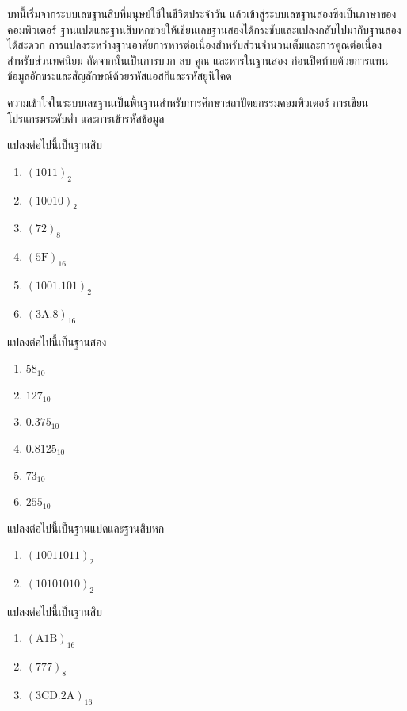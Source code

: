 \label{sec:chapter-summary-numbase}
บทนี้เริ่มจากระบบเลขฐานสิบที่มนุษย์ใช้ในชีวิตประจำวัน แล้วเข้าสู่ระบบเลขฐานสองซึ่งเป็นภาษาของคอมพิวเตอร์ ฐานแปดและฐานสิบหกช่วยให้เขียนเลขฐานสองได้กระชับและแปลงกลับไปมากับฐานสองได้สะดวก การแปลงระหว่างฐานอาศัยการหารต่อเนื่องสำหรับส่วนจำนวนเต็มและการคูณต่อเนื่องสำหรับส่วนทศนิยม ถัดจากนั้นเป็นการบวก ลบ คูณ และหารในฐานสอง ก่อนปิดท้ายด้วยการแทนข้อมูลอักขระและสัญลักษณ์ด้วยรหัสแอสกีและรหัสยูนิโคด

ความเข้าใจในระบบเลขฐานเป็นพื้นฐานสำหรับการศึกษาสถาปัตยกรรมคอมพิวเตอร์ การเขียนโปรแกรมระดับต่ำ และการเข้ารหัสข้อมูล~\parencite{rosen2019discrete}


\clearpage
{}
\label{sec:exercises-numbase}
\begin{exercise}
แปลงต่อไปนี้เป็นฐานสิบ
\begin{enumerate}
    \item $(1011)_2$
    \item $(10010)_2$
    \item $(72)_8$
    \item $(5\mathrm{F})_{16}$
    \item $(1001.101)_2$
    \item $(3\mathrm{A}.8)_{16}$
\end{enumerate}
\end{exercise}

\begin{exercise}
แปลงต่อไปนี้เป็นฐานสอง
\begin{enumerate}
    \item $58_{10}$
    \item $127_{10}$
    \item $0.375_{10}$
    \item $0.8125_{10}$
    \item $73_{10}$
    \item $255_{10}$
\end{enumerate}
\end{exercise}

\begin{exercise}
แปลงต่อไปนี้เป็นฐานแปดและฐานสิบหก
\begin{enumerate}
    \item $(10011011)_2$
    \item $(10101010)_2$
\end{enumerate}
\end{exercise}

\begin{exercise}
แปลงต่อไปนี้เป็นฐานสิบ
\begin{enumerate}
    \item $(\mathrm{A}1\mathrm{B})_{16}$
    \item $(777)_8$
    \item $(3\mathrm{CD}.2\mathrm{A})_{16}$
\end{enumerate}
\end{exercise}

